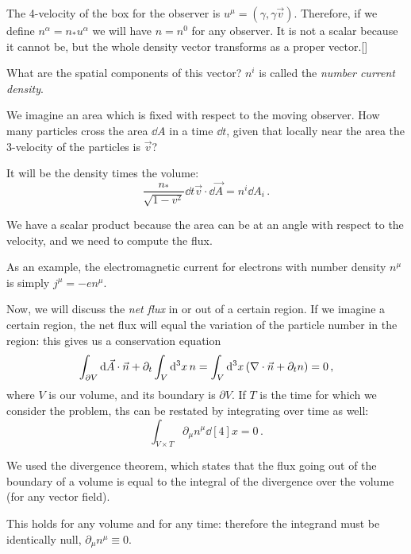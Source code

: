 \documentclass[main.tex]{subfiles}
\begin{document}
The 4-velocity of the box for the observer is \(u^{\mu }= (\gamma , \gamma \vec{v})\). Therefore, if we define \(n^{\alpha }= n_{*} u^{\alpha }\) we will have \(n = n^{0}\) for any observer.
It is not a scalar because it cannot be, but the whole density vector transforms as a proper vector.[]

What are the spatial components of this vector? \(n^{i}\)   is called the \emph{number current density}.

We imagine an area which is fixed with respect to the moving observer. How many particles cross the area \(\dd{A} \) in a time \(\dd{t}\), given that locally near the area the 3-velocity of the particles is \(\vec{v}\)?

It will be the density times the volume: 
%
\begin{equation}
  \frac{n_{*}}{\sqrt{1-v^2} } \dd{t} \vec{v} \cdot \dd{\vec{A}} = n^{i} \dd{A_{i}} 
\,.
\end{equation}
%

We have a scalar product because the area can be at an angle with respect to the velocity, and we need to compute the flux.

As an example, the electromagnetic current for electrons with number density \(n^{\mu }\) is simply \(j^{\mu } = -e n^{\mu }\).

Now, we will discuss the \emph{net flux} in or out of a certain region. If we imagine a certain region, the net flux will equal the variation of the particle number in the region: this gives us a conservation equation 
%
\begin{equation}
  \int _{\partial V} \dd{\vec{A}} \cdot \vec{n} + \partial_{t} \int _{V} \dd[3]{x} n 
  = \int _{V} \dd[3]{x} \qty(\nabla \cdot \vec{n} + \partial_t n) 
  = 0
\,,
\end{equation}
%
where \(V\) is our volume, and its boundary is \(\partial V\). If \(T\) is the time for which we consider the problem, ths can be restated by integrating over time as well: 
%
\begin{equation}
    \int _{V \times T} \partial_{\mu } n^{\mu } \dd[4]{x} 
  = 0
\,.
\end{equation}
%

We used the divergence theorem, which states that the flux going out of the boundary of a volume is equal to the integral of the divergence over the volume (for any vector field).

This holds for any volume and for any time: therefore the integrand must be identically null, \(\partial_{\mu }n^{\mu }\equiv 0\).
\end{document}
